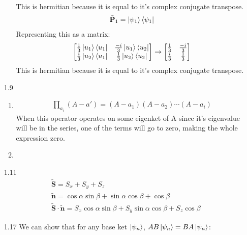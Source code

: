 \documentclass[12pt]{article}
\newcommand{\op}[1]{\tilde{\mathbf{#1}}}
\begin{document}
\begin{enumerate}
\begin{enumerate}
\begin{gather*}
            \end{gather*}
            This is hermitian because it is equal to it's complex conjugate transpose.
            \begin{gather*}
                \op{P}_1=\ket{\psi_1}\bra{\psi_1}
            \end{gather*}
            Representing this as a matrix:
            \begin{gather*}
                \begin{bmatrix}
                    \frac{1}{3}\ket{u_1}\bra{u_1} & \frac{-i}{3}\ket{u_1}\bra{u_2} \\
                    \frac{i}{3}\ket{u_2}\bra{u_1} & \frac{1}{3}\ket{u_2}\bra{u_2}
                \end{bmatrix}
                \rightarrow
                \begin{bmatrix}
                    \frac{1}{3} & \frac{-i}{3} \\
                    \frac{i}{3} & \frac{1}{3}
                \end{bmatrix}
            \end{gather*}
            This is hermitian because it is equal to it's complex conjugate transpose.
        \end{enumerate}
        \item[1.9]
        \begin{enumerate}
            \item
            \begin{gather*}
                \prod_{a_i}(A-a')=(A-a_1)(A-a_2)\cdots(A-a_i)
            \end{gather*}
            When this operator operates on some eigenket of A since it's eigenvalue will be in the series, one of the terms will go to zero, making the whole expression zero.
            \item
        \end{enumerate}
        \item[1.11]
        \begin{gather*}
            \op{S}=S_x+S_y+S_z\\
            \op{n}=\cos\alpha\sin\beta+\sin\alpha\cos\beta+\cos\beta\\
            \op{S}\cdot\op{n}=S_x\cos\alpha\sin\beta+S_y\sin\alpha\cos\beta+S_z\cos\beta
        \end{gather*}
        \item[1.17]
        We can show that for any base ket $\ket{\psi_n}$, $AB\ket{\psi_n}=BA\ket{\psi_n}$:

\end{enumerate}
\end{document}
